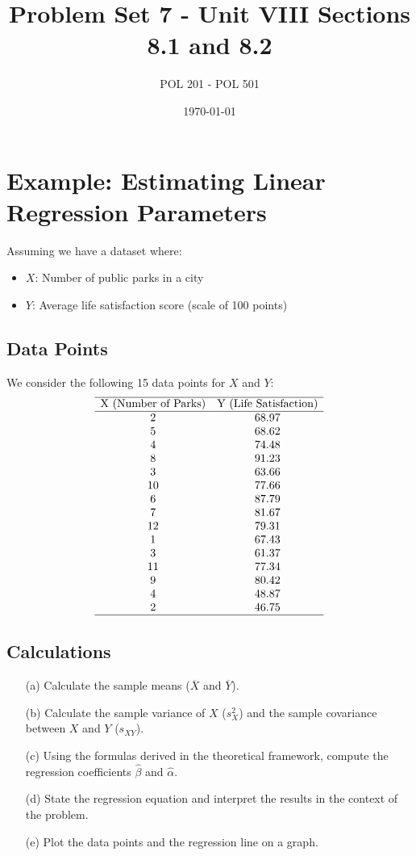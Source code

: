 \documentclass[11pt]{article}
\title{Problem Set 7 - Unit VIII Sections 8.1 and 8.2}
\author{POL 201 - POL 501}
\date{\today}
\begin{document}
\maketitle

\section{Example: Estimating Linear Regression Parameters}

Assuming we have a dataset where:
\begin{itemize}
    \item \(X\): Number of public parks in a city
    \item \(Y\): Average life satisfaction score (scale of 100 points)
\end{itemize}

\subsection*{Data Points}
We consider the following 15 data points for \(X\) and \(Y\):
\[
\begin{array}{cc}
\hline
    \text{X (Number of Parks)} & \text{Y (Life Satisfaction)} \\ \hline
    2 & 68.97 \\
    5 & 68.62 \\
    4 & 74.48 \\
    8 & 91.23 \\
    3 & 63.66 \\
    10 & 77.66 \\
    6 & 87.79 \\
    7 & 81.67 \\
    12 & 79.31 \\
    1 & 67.43 \\
    3 & 61.37 \\
    11 & 77.34 \\
    9 & 80.42 \\
    4 & 48.87 \\
    2 & 46.75 \\ \hline
\end{array}
\]

\subsection*{Calculations}
\begin{itemize}
    \item[(a)] Calculate the sample means (\(\overline{X}\) and \(\overline{Y}\)).
    \item[(b)] Calculate the sample variance of \(X\) (\(s_X^2\)) and the sample covariance between \(X\) and \(Y\) (\(s_{XY}\)).
    \item[(c)] Using the formulas derived in the theoretical framework, compute the regression coefficients \(\hat{\beta}\) and \(\hat{\alpha}\).
    \item[(d)] State the regression equation and interpret the results in the context of the problem.
    \item[(e)] Plot the data points and the regression line on a graph.
\end{itemize}
\end{document}
